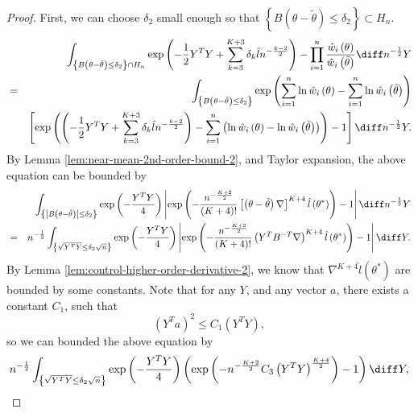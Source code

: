 \begin{proof}
First, we can choose $\delta_{2}$ small enough so that $\left\{ B\left(\theta-\tilde{\theta}\right)\le\delta_{2}\right\} \subset H_{n}$.
\begin{eqnarray*}
 &  & \int_{\left\{ B\left(\theta-\tilde{\theta}\right)\le\delta_{2}\right\} \cap H_{n}}\exp\left(-\frac{1}{2}Y^{T}Y+\sum_{k=3}^{K+3}\delta_{k}\hat{l}n^{-\frac{k-2}{2}}\right)-\prod_{i=1}^{n}\frac{\hat{w}_{i}\left(\theta\right)}{\hat{w}_{i}\left(\tilde{\theta}\right)}\diff n^{-\frac{1}{2}}Y\\
 & = & \int_{\left\{ B\left(\theta-\tilde{\theta}\right)\le\delta_{2}\right\} }\exp\left(\sum_{i=1}^{n}\ln\hat{w}_{i}\left(\theta\right)-\sum_{i=1}^{n}\ln\hat{w}_{i}\left(\tilde{\theta}\right)\right)\\
 &  & \left[\exp\left(\left(-\frac{1}{2}Y^{T}Y+\sum_{k=3}^{K+3}\delta_{k}\hat{l}n^{-\frac{k-2}{2}}\right)-\sum_{i=1}^{n}\left(\ln\hat{w}_{i}\left(\theta\right)-\ln\hat{w}_{i}\left(\tilde{\theta}\right)\right)\right)-1\right]\diff n^{-\frac{1}{2}}Y.
\end{eqnarray*}
By Lemma \ref{lem:near-mean-2nd-order-bound-2}, and Taylor expansion, the
above equation can be bounded by 
\begin{eqnarray*}
 &  & \int_{\left\{ \left|B\left(\theta-\tilde{\theta}\right)\right|\le\delta_{2}\right\} }\exp\left(-\frac{Y^{T}Y}{4}\right)\left|\exp\left(-\frac{n^{-\frac{K+2}{2}}}{\left(K+4\right)!}\left[\left(\theta-\tilde{\theta}\right)\nabla\right]^{K+4}\hat{l}\left(\theta^{*}\right)\right)-1\right|\diff n^{-\frac{1}{2}}Y\\
 & = & n^{-\frac{1}{2}}\int_{\left\{ \sqrt{Y^{T}Y}\le\delta_{2}\sqrt{n}\right\} }\exp\left(-\frac{Y^{T}Y}{4}\right)\left|\exp\left(-\frac{n^{-\frac{K+2}{2}}}{\left(K+4\right)!}\left(Y^{T}B^{-T}\nabla\right)^{K+4}\hat{l}\left(\theta^{*}\right)\right)-1\right|\diff Y.
\end{eqnarray*}
By Lemma \ref{lem:control-higher-order-derivative-2}, we know that $\nabla^{K+4}\hat{l}\left(\theta^{*}\right)$
are bounded by some constants. Note that for any $Y$, and any vector
$a$, there exists a constant $C_{1}$, such that 
\begin{equation}
\left(Y^{T}a\right)^{2}\le C_{1}\left(Y^{T}Y\right),\label{eq:average-inequality}
\end{equation}
so we can bounded the above equation by 
\[
n^{-\frac{1}{2}}\int_{\left\{ \sqrt{Y^{T}Y}\le\delta_{2}\sqrt{n}\right\} }\exp\left(-\frac{Y^{T}Y}{4}\right)\left(\exp\left(-n^{-\frac{K+2}{2}}C_{3}\left(Y^{T}Y\right)^{\frac{K+4}{2}}\right)-1\right)\diff Y,
\]
\end{proof}
